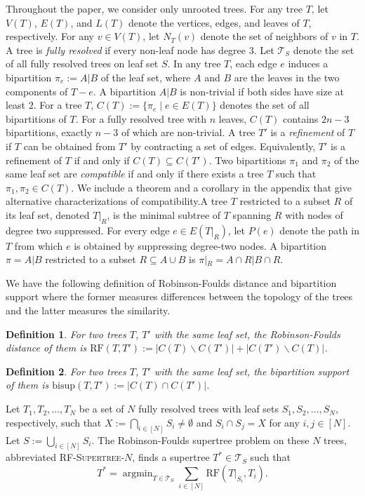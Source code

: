 \documentclass{bmcart}
\newcommand{\bs}{\mathrm{bisup}}
\newcommand{\RF}{\mathrm{RF}}
\newcommand{\rfn}{\textsc{RF-Supertree-$N$}\xspace}
\DeclareMathOperator*{\argmin}{argmin}
\theoremstyle{mystyle}
\newtheorem{definition}{Definition}
\theoremstyle{proofstyle}
\begin{document}
Throughout the paper, we consider only unrooted trees. For any tree $T$, let $V(T)$, $E(T)$, and $L(T)$ denote the vertices, edges, and leaves of $T$, respectively. For any $v\in V(T)$, let $N_T(v)$ denote the set of neighbors of $v$ in $T$. A tree is \textit{fully resolved} if every non-leaf node has degree $3$. Let $\mathcal{T}_S$ denote the set of all fully resolved trees on leaf set $S$. In any tree $T$, each edge $e$ induces a bipartition $\pi_e := A|B$ of the leaf set, where $A$ and $B$ are the leaves in the two components of $T-e$. A bipartition $A|B$ is non-trivial if both sides have size at least $2$. For a tree $T$, $C(T) := \{\pi_e \mid e\in E(T)\}$ denotes the set of all bipartitions of $T$. For a fully resolved tree with $n$ leaves, $C(T)$ contains $2n-3$ bipartitions, exactly $n-3$ of which are non-trivial. A tree $T'$ is a \textit{refinement} of $T$ if $T$ can be obtained from $T'$ by contracting a set of edges. Equivalently, $T'$ is a refinement of $T$ if and only if $C(T) \subseteq C(T')$. Two bipartitions $\pi_1$ and $\pi_2$ of the same leaf set are \textit{compatible} if and only if there exists a tree $T$ such that $\pi_1, \pi_2 \in C(T)$. We include a theorem and a corollary in the appendix that give alternative characterizations of compatibility.A tree $T$ restricted to a subset $R$ of its leaf set, denoted $T|_R$, is the minimal subtree of $T$ spanning $R$ with nodes of degree two suppressed. For every edge $e \in E(T|_R)$, let $P(e)$ denote the path in $T$ from which $e$ is obtained by suppressing degree-two nodes. A bipartition $\pi = A|B$ restricted to a subset $R \subseteq A\cup B$ is $\pi|_R = A\cap R | B\cap R$.\smallskip

We have the following definition of Robinson-Foulds distance and bipartition support where the former measures differences between the topology of the trees and the latter measures the similarity.
\begin{definition}
For two trees $T$, $T'$ with the same leaf set, the \textit{Robinson-Foulds distance} of them is $\RF(T, T') := |C(T)\backslash C(T')| + |C(T') \backslash C(T)|$.
\end{definition}

\begin{definition}
For two trees $T$, $T'$ with the same leaf set, the \textit{bipartition support} of them is $\bs(T, T') := |C(T) \cap C(T')|$.
\end{definition}

Let $T_1,T_2,\dots,T_N$ be a set of $N$ fully resolved trees with leaf sets $S_1,S_2,\dots,S_N$, respectively, such that $X:= \bigcap_{i \in [N]} S_i \neq \emptyset$ and $S_i \cap S_j = X$ for any $i,j \in [N]$. Let $S := \bigcup_{i \in [N]}S_i$. The Robinson-Foulds supertree problem on these $N$ trees, abbreviated \rfn, finds a supertree $T^* \in \mathcal{T}_S$ such that
\[T^* = \argmin_{T \in \mathcal{T}_S} \sum_{i \in [N]} \RF(T|_{S_i}, T_i).\]
\end{document}
